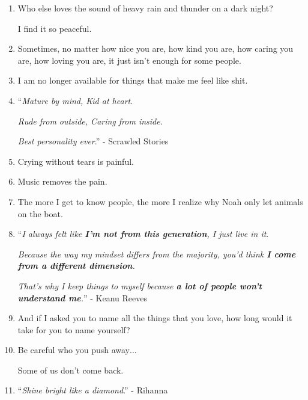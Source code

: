 \documentclass{article}
\numberwithin{equation}{section}
\begin{document}
\begin{enumerate}
    Let your mind settle things with your heart.
    
    And most importantly, love yourself 1st.
    \item Who else loves the sound of heavy rain and thunder on a dark night?
    
    I find it so peaceful.
    \item Sometimes, no matter how nice you are, how kind you are, how caring you are, how loving you are, it just isn't enough for some people.
    \item I am no longer available for things that make me feel like shit.
    \item ``\textit{Mature by mind, Kid at heart}.
    
    \textit{Rude from outside, Caring from inside}.
    
    \textit{Best personality ever}.'' - Scrawled Stories
    \item Crying without tears is painful.
    \item Music removes the pain.
    \item The more I get to know people, the more I realize why Noah only let animals on the boat.
    \item ``\textit{I always felt like \textbf{I'm not from this generation}, I just live in it}.
    
    \textit{Because the way my mindset differs from the majority, you'd think \textbf{I come from a different dimension}.}
    
    \textit{That's why I keep things to myself because \textbf{a lot of people won't understand me}.}'' - Keanu Reeves
    \item And if I asked you to name all the things that you love, how long would it take for you to name yourself?
    \item Be careful who you push away$\ldots$
    
    Some of us don't come back.
    \item ``\textit{Shine bright like a diamond}.'' - Rihanna
    

\end{enumerate}
\end{document}
